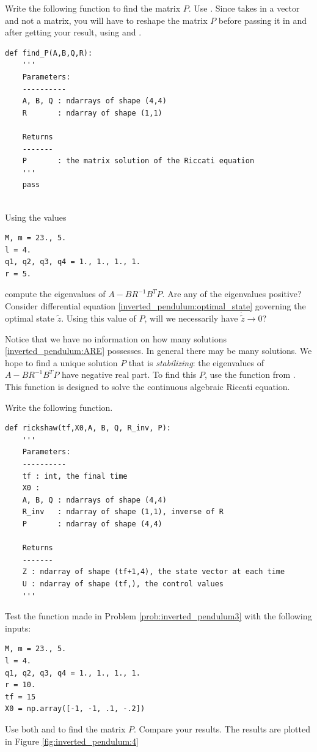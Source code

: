 \begin{problem}
Write the following function to find the matrix $P$. 
Use . 
Since  takes in a vector and not a matrix, you will have to reshape the matrix $P$ before passing it in and after getting your result, using  and .
\begin{lstlisting}
def find_P(A,B,Q,R):
	'''
	Parameters:
	----------
	A, B, Q : ndarrays of shape (4,4)
	R		: ndarray of shape (1,1)
	
	Returns
	-------
	P		: the matrix solution of the Riccati equation
	'''
	pass


\end{lstlisting}
Using the values 
\begin{lstlisting}
M, m = 23., 5.
l = 4.
q1, q2, q3, q4 = 1., 1., 1., 1.
r = 5.
\end{lstlisting}
compute the eigenvalues of $A - BR^{-1}B^TP$.
Are any of the eigenvalues positive? 
Consider differential equation \eqref{inverted_pendulum:optimal_state} governing the optimal state $\tilde{z}$. 
Using this value of $P$, will we necessarily have $\dot{\tilde{z}} \to 0$?
\end{problem}


Notice that we have no information on how many solutions \eqref{inverted_pendulum:ARE} possesses. 
In general there may be many solutions. 
We hope to find a unique solution $P$ that is \textit{stabilizing}: the eigenvalues of $A - BR^{-1}B^TP$ have negative real part. 
To find this $P$, use the function  from . 
This function is designed to solve the continuous algebraic Riccati equation. 

\begin{problem}
	Write the following function.
\begin{lstlisting}
def rickshaw(tf,X0,A, B, Q, R_inv, P):
	'''
	Parameters:
	----------
	tf : int, the final time
	X0 : 
	A, B, Q	: ndarrays of shape (4,4)
	R_inv	: ndarray of shape (1,1), inverse of R
	P		: ndarray of shape (4,4)
	
	Returns
	-------
	Z : ndarray of shape (tf+1,4), the state vector at each time
	U : ndarray of shape (tf,), the control values
	'''
\end{lstlisting}
\label{prob:inverted_pendulum3}
\end{problem}

\begin{problem}
Test the function made in Problem \eqref{prob:inverted_pendulum3} with the following inputs: 
\begin{lstlisting}
M, m = 23., 5.
l = 4.
q1, q2, q3, q4 = 1., 1., 1., 1.
r = 10.
tf = 15
X0 = np.array([-1, -1, .1, -.2])
\end{lstlisting}
Use both  and  to find the matrix $P$. Compare your results. The results are plotted in Figure \ref{fig:inverted_pendulum:4} 
\label{prob:inverted_pendulum:4}
\end{problem}



